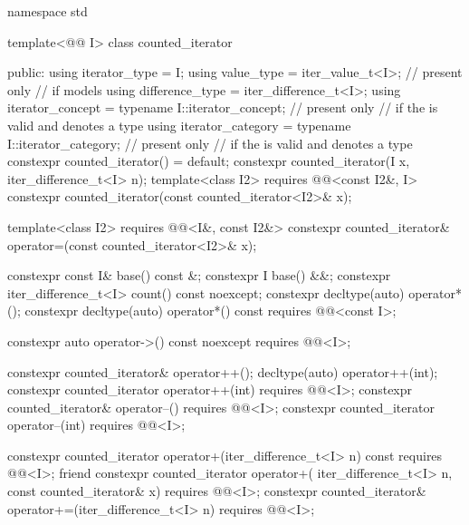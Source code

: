 %
\begin{codeblock}
namespace std {
  template<@@ I>
  class counted_iterator {
  public:
    using iterator_type = I;
    using value_type = iter_value_t<I>;                         // present only
                        // if  models 
    using difference_type = iter_difference_t<I>;
    using iterator_concept = typename I::iterator_concept;      // present only
                        // if the   is valid and denotes a type
    using iterator_category = typename I::iterator_category;    // present only
                        // if the   is valid and denotes a type
    constexpr counted_iterator() = default;
    constexpr counted_iterator(I x, iter_difference_t<I> n);
    template<class I2>
      requires @@<const I2&, I>
        constexpr counted_iterator(const counted_iterator<I2>& x);

    template<class I2>
      requires @@<I&, const I2&>
        constexpr counted_iterator& operator=(const counted_iterator<I2>& x);

    constexpr const I& base() const &;
    constexpr I base() &&;
    constexpr iter_difference_t<I> count() const noexcept;
    constexpr decltype(auto) operator*();
    constexpr decltype(auto) operator*() const
      requires @@<const I>;

    constexpr auto operator->() const noexcept
      requires @@<I>;

    constexpr counted_iterator& operator++();
    decltype(auto) operator++(int);
    constexpr counted_iterator operator++(int)
      requires @@<I>;
    constexpr counted_iterator& operator--()
      requires @@<I>;
    constexpr counted_iterator operator--(int)
      requires @@<I>;

    constexpr counted_iterator operator+(iter_difference_t<I> n) const
      requires @@<I>;
    friend constexpr counted_iterator operator+(
      iter_difference_t<I> n, const counted_iterator& x)
        requires @@<I>;
    constexpr counted_iterator& operator+=(iter_difference_t<I> n)
      requires @@<I>;

}}
\end{codeblock}
